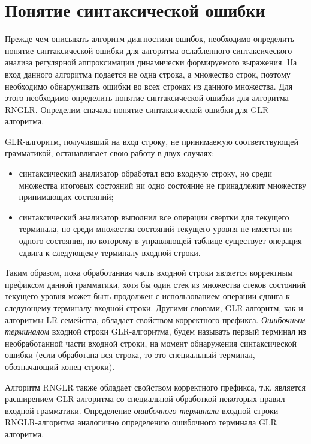 \clearpage
\section{Понятие синтаксической ошибки}
Прежде чем описывать алгоритм диагностики ошибок, необходимо определить понятие синтаксической ошибки для алгоритма ослабленного синтаксического анализа регулярной аппроксимации динамически формируемого выражения. На вход данного алгоритма подается не одна строка, а множество строк, поэтому необходимо обнаруживать ошибки во всех строках из данного множества. Для этого необходимо определить понятие синтаксической ошибки для алгоритма RNGLR. Определим сначала понятие синтаксической ошибки для GLR-алгоритма.

GLR-алгоритм, получивший на вход строку, не принимаемую соответствующей грамматикой, останавливает свою работу в двух случаях:
\begin{itemize}
    \item синтаксический анализатор обработал всю входную строку, но среди множества итоговых состояний ни одно состояние не принадлежит множеству принимающих состояний;
    \item синтаксический анализатор выполнил все операции свертки для текущего терминала, но среди множества состояний текущего уровня не имеется ни одного состояния, по которому в управляющей таблице существует операция сдвига к следующему терминалу входной строки.
\end{itemize}

Таким образом, пока обработанная часть входной строки является корректным префиксом данной грамматики, хотя бы один стек из множества стеков состояний текущего уровня может быть продолжен с использованием операции сдвига к следующему терминалу входной строки. Другими словами, GLR-алгоритм, как и алгоритмы LR-семейства, обладает свойством корректного префикса. \emph{Ошибочным терминалом} входной строки GLR-алгоритма, будем называть первый терминал из необработанной части входной строки, на момент обнаружения синтаксической ошибки (если обработана вся строка, то это специальный терминал, обозначающий конец строки).

Алгоритм RNGLR также обладает свойством корректного префикса, т.к. является расширением GLR-алгоритма со специальной обработкой некоторых правил входной грамматики. Определение \emph{ошибочного терминала} входной строки RNGLR-алгоритма аналогично определению ошибочного терминала GLR алгоритма.

